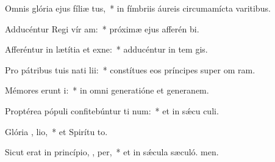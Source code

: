 \item Omnis glória ejus fíliæ   tus,~* in fímbriis áureis circumamícta varitibus.
\item Adducéntur Regi vír  am:~* próximæ ejus afferén bi.
\item Afferéntur in lætítia et exne:~* adducéntur in tem gis.
\item Pro pátribus tuis nati   lii:~* constítues eos príncipes super om ram.
\item Mémores erunt  i:~* in omni generatióne et generanem.
\item Proptérea pópuli confitebúntur ti  num:~* et in sǽcu culi.
\item Glória ,  lio,~* et Spirítu to.
\item Sicut erat in princípio,  ,  per,~* et in sǽcula sæculó. men.
